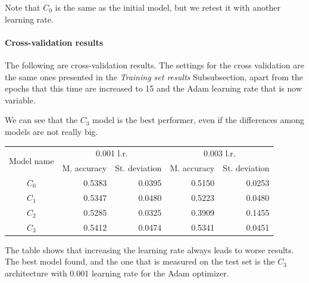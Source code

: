 Note that $C_0$ is the same as the initial model, but we retest it with another learning rate.

\paragraph{Cross-validation results}
The following are cross-validation results. 
The settings for the cross validation are the same ones presented in the \emph{Training set results}
Subsubsection, apart from the epochs that this time are increased to 15 and the Adam 
learning rate that is now variable.

We can see that the $C_3$ model is the best performer, even if the differences among models are not really big.
\begin{center}
    \begin{tabular}{ |c|r|r|r|r| } 
        \hline
        \multirow{2}{*}{Model name} & \multicolumn{2}{c|}{0.001 l.r.} & \multicolumn{2}{c|}{0.003 l.r.}  \\
        \cline{2-5}
        & M. accuracy & St. deviation & M. accuracy & St. deviation \\
        \hline
        $C_0$ & 0.5383 & 0.0395 & 0.5150 & 0.0253 \\
        $C_1$ & 0.5347 & 0.0480 & 0.5223 & 0.0480 \\
        $C_2$ & 0.5285 & 0.0325 & 0.3909 & 0.1455 \\
        $C_3$ & 0.5412 & 0.0474 & 0.5341 & 0.0451 \\
        \hline
    \end{tabular}
\end{center}

The table shows that increasing the learning rate always leads to worse results.
The best model found, and the one that is measured on the test set is 
the $C_3$ architecture with 0.001 learning rate for the Adam optimizer.

